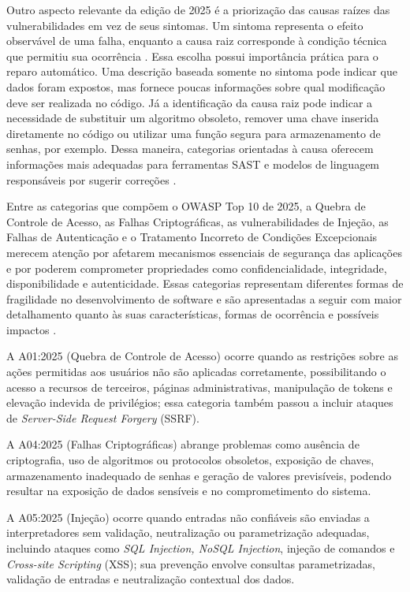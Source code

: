 Outro aspecto relevante da edição de 2025 é a priorização das causas raízes das vulnerabilidades em vez de seus sintomas. Um sintoma representa o efeito observável de uma falha, enquanto a causa raiz corresponde à condição técnica que permitiu sua ocorrência \cite{owasp_top10_2025_intro}. Essa escolha possui importância prática para o reparo automático. Uma descrição baseada somente no sintoma pode indicar que dados foram expostos, mas fornece poucas informações sobre qual modificação deve ser realizada no código. Já a identificação da causa raiz pode indicar a necessidade de substituir um algoritmo obsoleto, remover uma chave inserida diretamente no código ou utilizar uma função segura para armazenamento de senhas, por exemplo. Dessa maneira, categorias orientadas à causa oferecem informações mais adequadas para ferramentas SAST e modelos de linguagem responsáveis por sugerir correções \cite{khan_code_2025}. 

Entre as categorias que compõem o OWASP Top 10 de 2025, a Quebra de Controle de Acesso, as Falhas Criptográficas, as vulnerabilidades de Injeção, as Falhas de Autenticação e o Tratamento Incorreto de Condições Excepcionais merecem atenção por afetarem mecanismos essenciais de segurança das aplicações e por poderem comprometer propriedades como confidencialidade, integridade, disponibilidade e autenticidade. Essas categorias representam diferentes formas de fragilidade no desenvolvimento de software e são apresentadas a seguir com maior detalhamento quanto às suas características, formas de ocorrência e possíveis impactos \cite{owasp_a01_2025,owasp_a04_2025,owasp_a05_2025,owasp_a07_2025,owasp_a10_2025}.

 

A A01:2025 (Quebra de Controle de Acesso) ocorre quando as restrições sobre as ações permitidas aos usuários não são aplicadas corretamente, possibilitando o acesso a recursos de terceiros, páginas administrativas, manipulação de tokens e elevação indevida de privilégios; essa categoria também passou a incluir ataques de\textit{ Server-Side Request Forgery }(SSRF). 

A A04:2025 (Falhas Criptográficas) abrange problemas como ausência de criptografia, uso de algoritmos ou protocolos obsoletos, exposição de chaves, armazenamento inadequado de senhas e geração de valores previsíveis, podendo resultar na exposição de dados sensíveis e no comprometimento do sistema. 

A A05:2025 (Injeção) ocorre quando entradas não confiáveis são enviadas a interpretadores sem validação, neutralização ou parametrização adequadas, incluindo ataques como \textit{SQL Injection, NoSQL Injection}, injeção de comandos e \textit{Cross-site Scripting} (XSS); sua prevenção envolve consultas parametrizadas, validação de entradas e neutralização contextual dos dados. 

